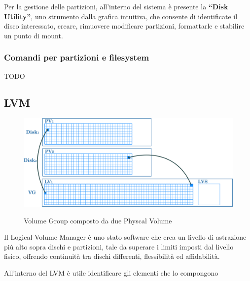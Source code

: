 Per la gestione delle partizioni, all'interno del sistema è presente la \textbf{``Disk Utility''}, uno strumento dalla grafica intuitiva, che consente di identificate il disco interessato, creare, rimuovere modificare partizioni, formattarle e stabilire un punto di mount. 

\subsubsection{Comandi per partizioni e filesystem}

TODO

\subsection{LVM}

\begin{figure}[!ht]
  \centering
  \includegraphics[scale=0.4]{Immagini/partitions.png}
  \label{fig:LVM_scheme}
  \caption{Volume Group composto da due Physcal Volume}
\end{figure}



Il Logical Volume Manager è uno stato software che crea un livello di astrazione più alto sopra dischi e partizioni, tale da superare i limiti imposti dal livello fisico, offrendo continuità tra dischi differenti, flessibilità ed affidabilità.

All'interno del LVM è utile identificare gli elementi che lo compongono

